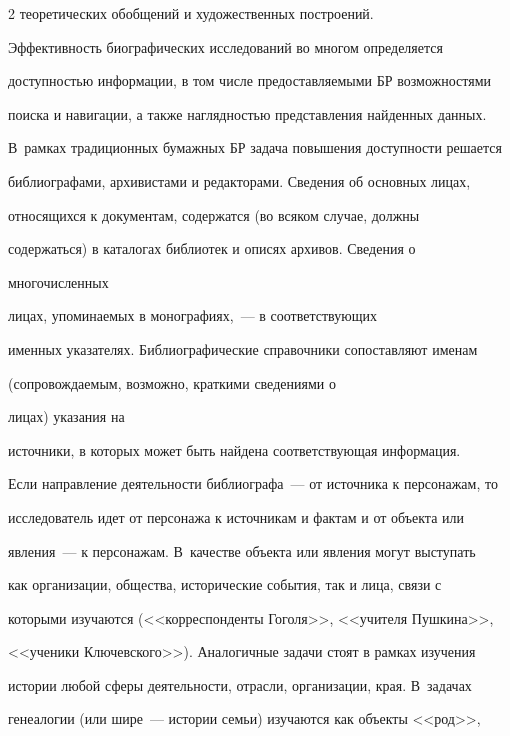 \begin{multicols}{2}
теоретических обобщений и художественных построений.


  


  Эффективность биографических исследований во многом определяется 


доступностью информации, в том числе предоставляемыми БР возможностями 


поиска и навигации, а также наглядностью представления найденных данных. 


В~рамках традиционных бумажных БР задача повышения доступности решается 


библиографами, архивистами и редакторами. Сведения об основных лицах, 


относящихся к документам, содержатся (во всяком случае, должны 


содержаться) в каталогах библиотек и описях архивов. Сведения о 


многочисленных\linebreak


 лицах, упоминаемых в монографиях,~--- в соответствующих 


именных указателях. Библиографические справочники сопоставляют именам 


(со\-про\-вож\-да\-емым, возможно, краткими сведениями о\linebreak


 лицах) указания на 


источники, в которых может быть найде\-на соответствующая информация. 


  


  Если направление деятельности библиографа~--- от источника к персонажам, то 


исследователь идет от персонажа к источникам и фактам и от объекта или 


явления~--- к персонажам. В~качестве объекта или явления могут выступать 


как организации, общества, исторические события, так и лица, связи с 


которыми изучаются (<<корреспонденты Гоголя>>, <<учителя Пушкина>>, 


<<ученики Ключевского>>). Аналогичные задачи стоят в рамках изучения 


истории любой сферы деятельности, отрасли, организации, края. В~задачах 


генеалогии (или шире~--- истории семьи) изучаются как объекты <<род>>, 



\end{multicols}
